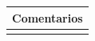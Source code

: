 \begin{table}[H]
    \begin{tabular}{llllllll}
    \hline
    \multicolumn{8}{|l|}{\cellcolor[HTML]{F2F2F2}Comentarios}                                                                                                                                                                                                                                                                                                                                                                                           \\ \hline
    \multicolumn{8}{|p{15cm}|}{{\color[HTML]{808080} \textit{}}}                                                                                                                                                                                                             \\ \hline
    \end{tabular}
\end{table}


